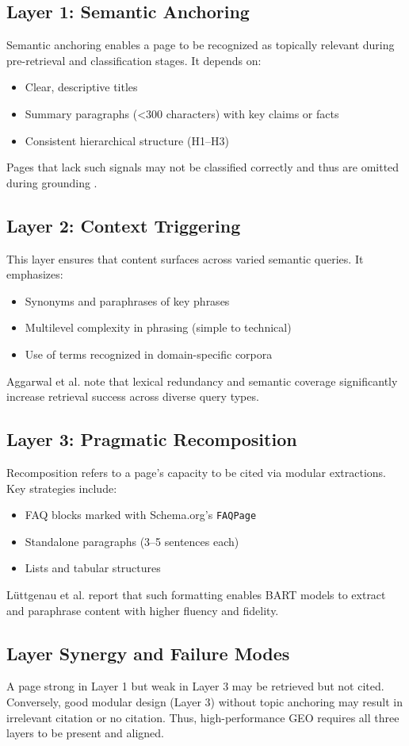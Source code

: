 \subsection{Layer 1: Semantic Anchoring}

Semantic anchoring enables a page to be recognized as topically relevant during pre-retrieval and classification stages. It depends on:
\begin{itemize}
  \item Clear, descriptive titles
  \item Summary paragraphs (<300 characters) with key claims or facts
  \item Consistent hierarchical structure (H1--H3)
\end{itemize}
Pages that lack such signals may not be classified correctly and thus are omitted during grounding \cite{liu2023verifiability}.

\subsection{Layer 2: Context Triggering}

This layer ensures that content surfaces across varied semantic queries. It emphasizes:
\begin{itemize}
  \item Synonyms and paraphrases of key phrases
  \item Multilevel complexity in phrasing (simple to technical)
  \item Use of terms recognized in domain-specific corpora
\end{itemize}
Aggarwal et al. \cite{aggarwal2024geo} note that lexical redundancy and semantic coverage significantly increase retrieval success across diverse query types.

\subsection{Layer 3: Pragmatic Recomposition}

Recomposition refers to a page’s capacity to be cited via modular extractions. Key strategies include:
\begin{itemize}
  \item FAQ blocks marked with Schema.org’s \texttt{FAQPage}
  \item Standalone paragraphs (3--5 sentences each)
  \item Lists and tabular structures
\end{itemize}
L\"uttgenau et al. \cite{luttgenau2025beyondseo} report that such formatting enables BART models to extract and paraphrase content with higher fluency and fidelity.

\subsection{Layer Synergy and Failure Modes}

A page strong in Layer 1 but weak in Layer 3 may be retrieved but not cited. Conversely, good modular design (Layer 3) without topic anchoring may result in irrelevant citation or no citation. Thus, high-performance GEO requires all three layers to be present and aligned.
